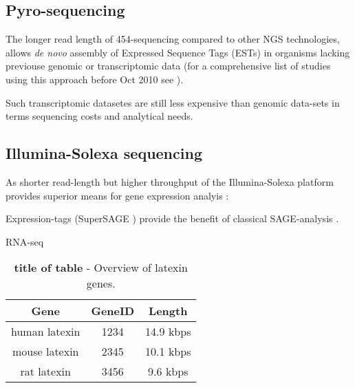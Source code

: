 
\subsection{Pyro-sequencing}

The longer read length of 454-sequencing \cite{pmid16056220} compared
to other NGS technologies, allows \textit{de novo} assembly of
Expressed Sequence Tags (ESTs) in organisms lacking previouse genomic
or transcriptomic data (for a comprehensive list of studies using this
approach before Oct 2010 see \cite{pmid20950480}).

Such transcriptomic datasetes are still less expensive than genomic
data-sets in terms sequencing costs and analytical needs.


\subsection{Illumina-Solexa sequencing}

As shorter read-length but higher throughput of the Illumina-Solexa
platform provides superior means for gene expression analyis
\cite{pmid21627854}:

Expression-tags (SuperSAGE \cite{pmid20967605}) provide the benefit of
classical SAGE-analysis  .

RNA-seq \cite{pmid19015660}

\begin{table}[htdp]
\centering
\begin{tabular}{ccc} %

{\bf Gene} & {\bf GeneID} & {\bf Length} \\ 
\hline %

human latexin & 1234 & 14.9 kbps \\
mouse latexin & 2345 & 10.1 kbps \\
rat latexin   & 3456 & 9.6 kbps \\

\end{tabular}
\caption[title of table]{\textbf{title of table} - Overview of latexin genes.}
\label{latexin_genes} %
\end{table}




     
